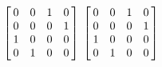 {$\left[\hskip -3pt \begin{array}{cccc} 0&0&1&0\\  0&0&0&1
\\  1&0&0&0\\  0&1&0&0
\end{array}\hskip -3pt \right] $ 
}
{$ \left[\hskip -3pt \begin{array}{cccc} 0&0&1&0\\  0&0&0&1
\\  1&0&0&0\\  0&1&0&0
\end{array}\hskip -3pt \right]$}
